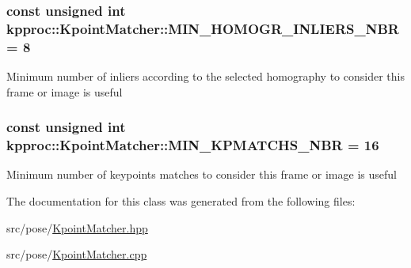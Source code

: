 \subsubsection[{\texorpdfstring{M\+I\+N\+\_\+\+H\+O\+M\+O\+G\+R\+\_\+\+I\+N\+L\+I\+E\+R\+S\+\_\+\+N\+BR}{MIN_HOMOGR_INLIERS_NBR}}]{\setlength{\rightskip}{0pt plus 5cm}const unsigned int kpproc\+::\+Kpoint\+Matcher\+::\+M\+I\+N\+\_\+\+H\+O\+M\+O\+G\+R\+\_\+\+I\+N\+L\+I\+E\+R\+S\+\_\+\+N\+BR = 8\hspace{0.3cm}{\ttfamily [static]}}\hypertarget{classkpproc_1_1KpointMatcher_a4d0c0de93ab29378a504265e263663f6}{}\label{classkpproc_1_1KpointMatcher_a4d0c0de93ab29378a504265e263663f6}
Minimum number of inliers according to the selected homography to consider this frame or image is useful 
\subsubsection[{\texorpdfstring{M\+I\+N\+\_\+\+K\+P\+M\+A\+T\+C\+H\+S\+\_\+\+N\+BR}{MIN_KPMATCHS_NBR}}]{\setlength{\rightskip}{0pt plus 5cm}const unsigned int kpproc\+::\+Kpoint\+Matcher\+::\+M\+I\+N\+\_\+\+K\+P\+M\+A\+T\+C\+H\+S\+\_\+\+N\+BR = 16\hspace{0.3cm}{\ttfamily [static]}}\hypertarget{classkpproc_1_1KpointMatcher_a35b716145fb33b20b3ca2bfec10e343e}{}\label{classkpproc_1_1KpointMatcher_a35b716145fb33b20b3ca2bfec10e343e}
Minimum number of keypoints matches to consider this frame or image is useful 

The documentation for this class was generated from the following files\+:\begin{DoxyCompactItemize}
\item 
src/pose/\hyperlink{KpointMatcher_8hpp}{Kpoint\+Matcher.\+hpp}\item 
src/pose/\hyperlink{KpointMatcher_8cpp}{Kpoint\+Matcher.\+cpp}\end{DoxyCompactItemize}
